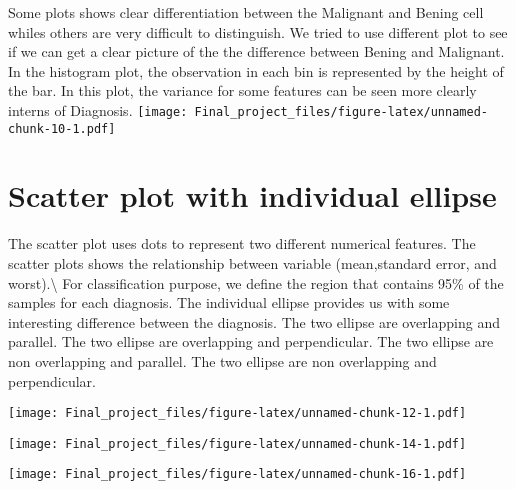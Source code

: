 \documentclass[
]{article}
\begin{document}
Some plots shows clear differentiation between the Malignant and Bening
cell whiles others are very difficult to distinguish. We tried to use
different plot to see if we can get a clear picture of the the
difference between Bening and Malignant. In the histogram plot, the
observation in each bin is represented by the height of the bar. In this
plot, the variance for some features can be seen more clearly interns of
Diagnosis.
\texttt{[image: Final\_project\_files/figure-latex/unnamed-chunk-10-1.pdf]}

\section{Scatter plot with individual ellipse}

The scatter plot uses dots to represent two different numerical
features. The scatter plots shows the relationship between variable
(mean,standard error, and worst).\textbackslash{} For classification
purpose, we define the region that contains 95\% of the samples for each
diagnosis. The individual ellipse provides us with some interesting
difference between the diagnosis. \bullet The two ellipse are
overlapping and parallel. \bullet The two ellipse are overlapping and
perpendicular. \bullet The two ellipse are non overlapping and parallel.
\bullet The two ellipse are non overlapping and perpendicular.

\texttt{[image: Final\_project\_files/figure-latex/unnamed-chunk-12-1.pdf]}

\texttt{[image: Final\_project\_files/figure-latex/unnamed-chunk-14-1.pdf]}

\texttt{[image: Final\_project\_files/figure-latex/unnamed-chunk-16-1.pdf]}
\end{document}
